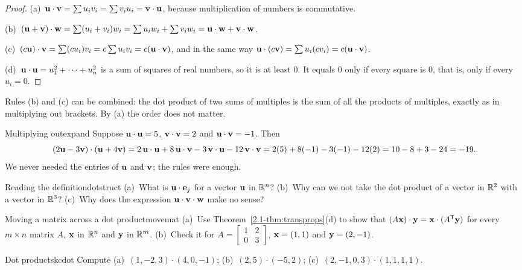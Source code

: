 \documentclass[11pt]{article}
\begin{document}
\begin{proof}
(a)~$\mathbf{u}\cdot\mathbf{v}=\sum u_iv_i=\sum v_iu_i=\mathbf{v}\cdot\mathbf{u}$, because multiplication of numbers is commutative.

(b)~$(\mathbf{u}+\mathbf{v})\cdot\mathbf{w}=\sum(u_i+v_i)w_i=\sum u_iw_i+\sum v_iw_i=\mathbf{u}\cdot\mathbf{w}+\mathbf{v}\cdot\mathbf{w}$.

(c)~$(c\mathbf{u})\cdot\mathbf{v}=\sum(cu_i)v_i=c\sum u_iv_i=c(\mathbf{u}\cdot\mathbf{v})$, and in the same way $\mathbf{u}\cdot(c\mathbf{v})=\sum u_i(cv_i)=c(\mathbf{u}\cdot\mathbf{v})$.

(d)~$\mathbf{u}\cdot\mathbf{u}=u_1^2+\cdots+u_n^2$ is a sum of squares of real numbers, so it is at least $0$. It equals $0$ only if every square is $0$, that is, only if every $u_i=0$.
\end{proof}

Rules (b) and (c) can be combined: the dot product of two sums of multiples is the sum of all the products of multiples, exactly as in multiplying out brackets. By (a) the order does not matter.

\begin{exmp}{Multiplying out}{expand}
Suppose $\mathbf{u}\cdot\mathbf{u}=5$, $\mathbf{v}\cdot\mathbf{v}=2$ and $\mathbf{u}\cdot\mathbf{v}=-1$. Then
\[
(2\mathbf{u}-3\mathbf{v})\cdot(\mathbf{u}+4\mathbf{v})=2\,\mathbf{u}\cdot\mathbf{u}+8\,\mathbf{u}\cdot\mathbf{v}-3\,\mathbf{v}\cdot\mathbf{u}-12\,\mathbf{v}\cdot\mathbf{v}=2(5)+8(-1)-3(-1)-12(2)=10-8+3-24=-19.
\]
We never needed the entries of $\mathbf{u}$ and $\mathbf{v}$; the rules were enough.
\end{exmp}

\begin{think}{Reading the definition}{dotstruct}
(a)~What is $\mathbf{u}\cdot\mathbf{e}_j$ for a vector $\mathbf{u}$ in $\mathbb{R}^n$? (b)~Why can we not take the dot product of a vector in $\mathbb{R}^2$ with a vector in $\mathbb{R}^3$? (c)~Why does the expression $\mathbf{u}\cdot\mathbf{v}\cdot\mathbf{w}$ make no sense?
\end{think}

\begin{think}{Moving a matrix across a dot product}{movemat}
(a)~Use Theorem~\ref{2.1-thm:transprops}(d) to show that $(A\mathbf{x})\cdot\mathbf{y}=\mathbf{x}\cdot(A^{\mathsf T}\mathbf{y})$ for every $m\times n$ matrix $A$, $\mathbf{x}$ in $\mathbb{R}^n$ and $\mathbf{y}$ in $\mathbb{R}^m$. (b)~Check it for $A=\begin{bmatrix}1&2\\0&3\end{bmatrix}$, $\mathbf{x}=(1,1)$ and $\mathbf{y}=(2,-1)$.
\end{think}

\begin{kc}{Dot products}{kcdot}
Compute (a)~$(1,-2,3)\cdot(4,0,-1)$; (b)~$(2,5)\cdot(-5,2)$; (c)~$(2,-1,0,3)\cdot(1,1,1,1)$.
\end{kc}
\end{document}
